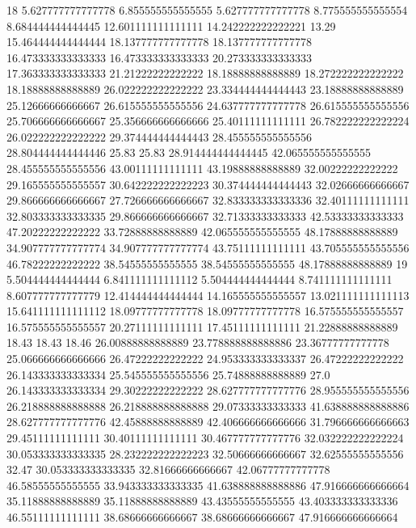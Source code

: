 18 5.627777777777778 6.855555555555555 5.627777777777778 8.775555555555554 8.684444444444445 12.601111111111111 14.242222222222221 13.29 15.464444444444444 18.137777777777778 18.137777777777778 16.473333333333333 16.473333333333333 20.273333333333333 17.363333333333333 21.21222222222222 18.18888888888889 18.272222222222222 18.18888888888889 26.022222222222222 23.334444444444443 23.18888888888889 25.12666666666667 26.615555555555556 24.637777777777778 26.615555555555556 25.706666666666667 25.356666666666666 25.40111111111111 26.782222222222224 26.022222222222222 29.374444444444443 28.455555555555556 28.804444444444446 25.83 25.83 28.914444444444445 42.065555555555555 28.455555555555556 43.00111111111111 43.19888888888889 32.00222222222222 29.165555555555557 30.642222222222223 30.374444444444443 32.02666666666667 29.866666666666667 27.726666666666667 32.833333333333336 32.40111111111111 32.803333333333335 29.866666666666667 32.71333333333333 42.53333333333333 47.20222222222222 33.72888888888889 42.065555555555555 48.17888888888889 34.907777777777774 34.907777777777774 43.75111111111111 43.705555555555556 46.78222222222222 38.54555555555555 38.54555555555555 48.17888888888889
19 5.504444444444444 6.841111111111112 5.504444444444444 8.741111111111111 8.607777777777779 12.414444444444444 14.165555555555557 13.021111111111113 15.641111111111112 18.09777777777778 18.09777777777778 16.575555555555557 16.575555555555557 20.27111111111111 17.45111111111111 21.22888888888889 18.43 18.43 18.46 26.00888888888889 23.778888888888886 23.36777777777778 25.066666666666666 26.47222222222222 24.953333333333337 26.47222222222222 26.143333333333334 25.545555555555556 25.74888888888889 27.0 26.143333333333334 29.30222222222222 28.627777777777776 28.955555555555556 26.218888888888888 26.218888888888888 29.07333333333333 41.638888888888886 28.627777777777776 42.45888888888889 42.406666666666666 31.796666666666663 29.45111111111111 30.40111111111111 30.467777777777776 32.032222222222224 30.053333333333335 28.232222222222223 32.50666666666667 32.62555555555556 32.47 30.053333333333335 32.81666666666667 42.06777777777778 46.58555555555555 33.943333333333335 41.638888888888886 47.916666666666664 35.11888888888889 35.11888888888889 43.43555555555555 43.403333333333336 46.55111111111111 38.68666666666667 38.68666666666667 47.916666666666664
